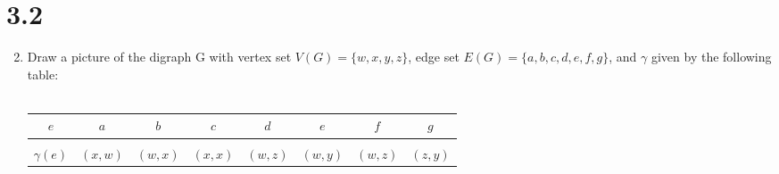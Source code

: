 \documentclass[11pt]{article}
\begin{document}
\section*{3.2}
\begin{enumerate}
\setcounter{enumi}{1}
\item Draw a picture of the digraph G with vertex set $V(G)=\{w,x,y,z\}$, edge set $E(G)=\{a,b,c,d,e,f,g\}$, and 
$\gamma$ given by the following table:\\\\
	\begin{tabular}{c|c c c c c c c}
		$e$ & $a$ & $b$ & $c$ & $d$ & $e$& $f$& $g$\\
		\hline
		\\
		$\gamma(e)$ & $(x,w)$ & $(w,x)$ & $(x,x)$ & $(w,z)$ & $(w,y)$ & $(w,z)$ & $(z,y)$\\
	\end{tabular}
	
\end{enumerate}
\end{document}
